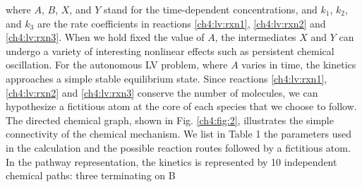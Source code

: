 where $A$, $B$, $X$, and $Y$ stand for the time-dependent
concentrations, and $k_1$, $k_2$, and $k_3$ are the rate coefficients in
reactions \ref{ch4:lv:rxn1}, \ref{ch4:lv:rxn2} and \ref{ch4:lv:rxn3}. When we hold fixed the value of $A$, the
intermediates $X$ and $Y$ can undergo a variety of interesting
nonlinear effects such as persistent chemical oscillation. For the
autonomous LV problem, where $A$ varies in time, the kinetics
approaches a simple stable equilibrium state. Since reactions
\ref{ch4:lv:rxn1}, \ref{ch4:lv:rxn2} and \ref{ch4:lv:rxn3} conserve the number of molecules, we can hypothesize
a fictitious atom at the core of each species that we choose to
follow. The directed chemical graph, shown in Fig. \ref{ch4:fig:2}, illustrates the simple connectivity of the chemical mechanism.
We list in Table 1 the parameters used in the calculation and
the possible reaction routes followed by a fictitious atom. In the
pathway representation, the kinetics is represented by 10
independent chemical paths: three terminating on B

